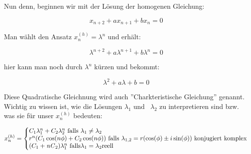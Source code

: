 \begin{uebsp}

{
Nun denn, beginnen wir mit der L\"osung der homogenen Gleichung:}



\begin{equation*}
x_{n+2}+\mathit{ax}_{n+1}+\mathit{bx}_{n}=0
\end{equation*}


{
Man w\"ahlt den Ansatz  $x_{n}^{(h)}=\lambda ^{n}$  und erh\"alt:}



\begin{equation*}
\lambda ^{n+2}+a\lambda ^{n+1}+b\lambda ^{n}=0
\end{equation*}


{
hier kann man noch durch  $\lambda ^{n}$ k\"urzen und bekommt:}



\begin{equation*}
\lambda ^{2}+a\lambda +b=0
\end{equation*}


{
Diese Quadratische Gleichnung wird auch ''Charkteristische
Gleichung'' genannt. Wichtig zu wissen ist, wie die
L\"osungen  $\lambda _{1}$ und \  $\lambda _{2}$ zu interpretieren sind
bzw. was sie f\"ur unser  $x_{n}^{(h)}$ bedeuten: }







\begin{equation*}
x_{n}^{(h)}=\left\{\begin{matrix}C_{1}\lambda _{1}^{n}+C_{2}\lambda
_{2}^{n}\text{  falls }\lambda _{1}\neq \lambda _{2}\hfill\null
\\r^{n}(C_{1}\cos (n\phi )+C_{2}\cos (n\phi ))\text{   falls }\lambda
_{1,2}=r(\cos (\phi )\pm i\sin (\phi ))\text{ konjugiert
komplex}\hfill\null \\(C_{1}+\mathit{nC}_{2})\lambda _{1}^{n}\text{  
falls}\lambda _{1}=\lambda _{2}\text{reell}\hfill\null
\end{matrix}\right.
\end{equation*}





\end{uebsp}
